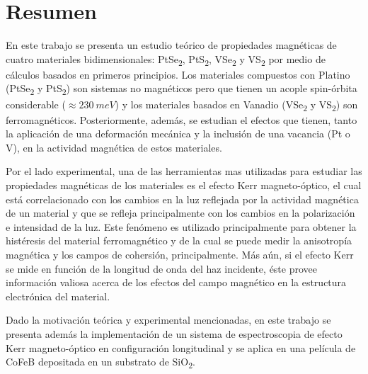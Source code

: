 \chapter{\centering Resumen}
\par En este trabajo se presenta un estudio te\'orico de  propiedades magn\'eticas de cuatro materiales bidimensionales: PtSe\textsubscript{2}, PtS\textsubscript{2}, VSe\textsubscript{2} y VS\textsubscript{2} por medio de c\'alculos basados  en primeros principios. Los materiales compuestos con Platino (PtSe\textsubscript{2} y PtS\textsubscript{2}) son sistemas no magn\'eticos pero que tienen un acople spin-\'orbita considerable ($\approx 230~meV$) y los materiales basados en Vanadio  (VSe\textsubscript{2} y VS\textsubscript{2}) son ferromagn\'eticos. Posteriormente, adem\'as, se estudian el efectos que tienen, tanto  la aplicaci\'on de  una deformación mec\'anica y la inclusi\'on  de una vacancia (Pt o V), en la actividad magn\'etica  de estos materiales.
\newline
\par Por el lado experimental, una de las herramientas mas utilizadas para estudiar las propiedades magn\'eticas de los materiales es el efecto Kerr magneto-\'optico, el cual est\'a correlacionado con los cambios en la luz reflejada por la actividad magn\'etica de un material y que se refleja principalmente con los cambios en la polarizaci\'on e intensidad de la luz. Este fenómeno es utilizado principalmente para obtener la hist\'eresis del material ferromagn\'etico y de la cual se puede medir la anisotrop\'ia magn\'etica y los campos de cohersi\'on, principalmente. M\'as a\'un, si el efecto Kerr se mide en funci\'on de la longitud de onda del haz incidente, \'este provee informaci\'on valiosa acerca de los efectos del campo  magn\'etico en la estructura electr\'onica del material. 
\newline
\par Dado la motivaci\'on te\'orica y experimental mencionadas, en este trabajo  se presenta adem\'as  la implementaci\'on de un sistema de espectroscopia de efecto Kerr magneto-\'optico en configuraci\'on longitudinal y se aplica en una pel\'icula de CoFeB depositada en un substrato de SiO\textsubscript{2}.
